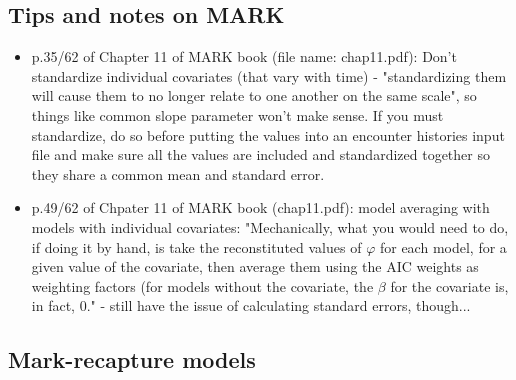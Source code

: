 \documentclass[12pt, oneside]{article}   	%
\begin{document}
\subsection*{Tips and notes on MARK}
\begin{itemize}
	\item p.35/62 of Chapter 11 of MARK book (file name: chap11.pdf): Don't standardize individual covariates (that vary with time) - "standardizing them will cause them to no longer relate to one another on the same scale", so things like common slope parameter won't make sense. If you must standardize, do so before putting the values into an encounter histories input file and make sure all the values are included and standardized together so they share a common mean and standard error.
	\item p.49/62 of Chpater 11 of MARK book (chap11.pdf): model averaging with models with individual covariates: "Mechanically, what you would need to do, if doing it by hand, is take the reconstituted values of $\varphi$ for each model, for a given value of the covariate, then average them using the AIC weights as weighting factors (for models without the covariate, the $\beta$ for the covariate is, in fact, 0." - still have the issue of calculating standard errors, though...
\end{itemize}

\subsection*{Mark-recapture models}
\end{document}
